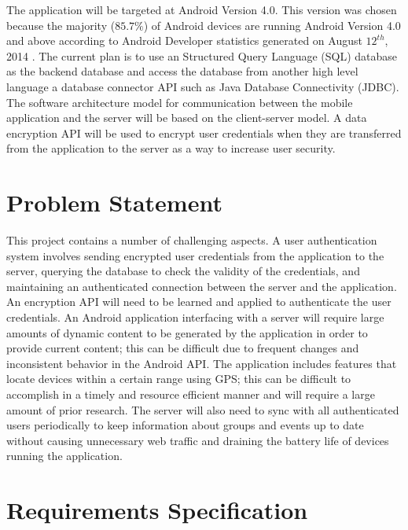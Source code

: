 \documentclass[11pt]{article}
\begin{document}
The application will be targeted at Android Version 4.0. This version was chosen because the majority 
($85.7\%$) of Android devices are running Android Version 4.0 and above according to Android Developer
statistics generated on August $12^{th}$, 2014 \cite{android_stats}. The current plan is to use an 
Structured Query Language (SQL) database as the backend database and access the database from another high level language 
a database connector API such as Java Database Connectivity (JDBC). The software architecture model for communication between the 
mobile application and the server will be based on the client-server model. A data encryption API
will be used to encrypt user credentials when they are transferred from the application to the 
server as a way to increase user security.

\section{Problem Statement}

This project contains a number of challenging aspects. A user authentication system involves sending 
encrypted user credentials from the application to the server, querying the database to check the 
validity of the credentials, and maintaining an authenticated connection between the server and 
the application. An encryption API will need to be learned and applied to authenticate the
user credentials. An Android application interfacing with a server will require large amounts of 
dynamic content to be generated by the application in order to provide current content; this can be 
difficult due to frequent changes and inconsistent behavior in the Android API. The application 
includes features that locate devices within a certain range using GPS; this can be difficult to 
accomplish in a timely and resource efficient manner and will require a large amount of prior research. 
The server will also need to sync with all authenticated users periodically to keep information about
groups and events up to date without causing unnecessary web traffic and draining the battery life 
of devices running the application.


\section{Requirements Specification}
\end{document}

